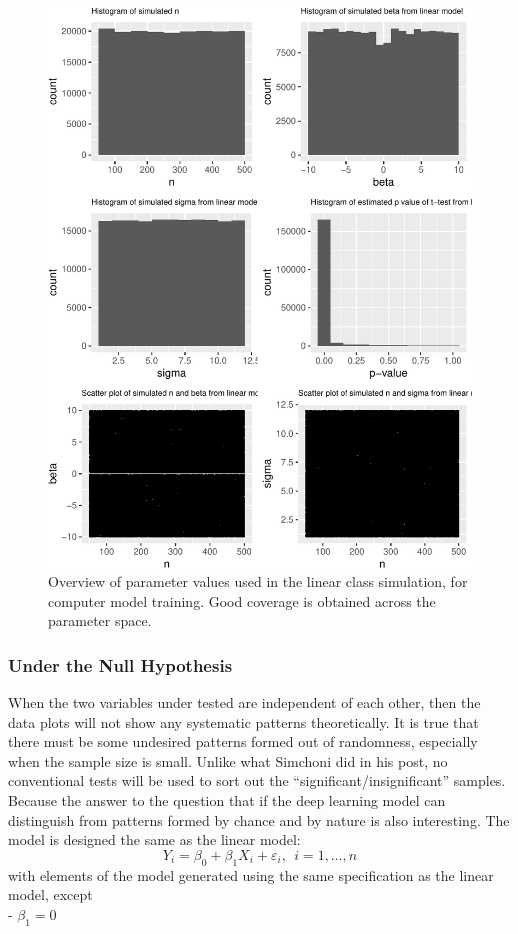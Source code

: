 \documentclass[12pt]{article}
\begin{document}
\begin{figure}
\centering
\includegraphics{pc_plots_files/figure-latex/simplot-1.pdf}
\caption{Overview of parameter values used in the linear class
simulation, for computer model training. Good coverage is obtained
across the parameter space.}
\end{figure}

\subsubsection{Under the Null
Hypothesis}\label{under-the-null-hypothesis}

When the two variables under tested are independent of each other, then
the data plots will not show any systematic patterns theoretically. It
is true that there must be some undesired patterns formed out of
randomness, especially when the sample size is small. Unlike what
Simchoni did in his post, no conventional tests will be used to sort out
the ``significant/insignificant'' samples. Because the answer to the
question that if the deep learning model can distinguish from patterns
formed by chance and by nature is also interesting. The model is
designed the same as the linear model:
\[Y_i = \beta_0 + \beta_1 X_{i}  + \varepsilon_i, ~~i=1, \dots , n\]
with elements of the model generated using the same specification as the
linear model, except\\
- \(\beta_1 = 0\)
\end{document}
